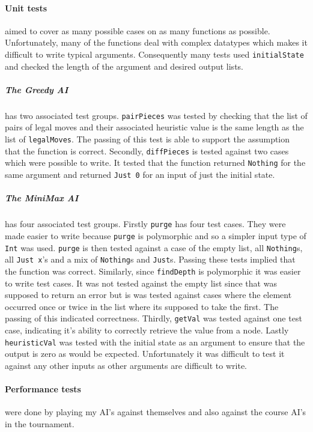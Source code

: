 \documentclass[11pt]{article}
\begin{document}
\paragraph{Unit tests} aimed to cover as many possible cases on as many functions as possible. Unfortunately, many of the functions deal with complex datatypes which makes it difficult to write typical arguments. Consequently many tests used \verb|initialState| and checked the length of the argument and desired output lists.

\subparagraph{The Greedy AI} has two associated test groups. \verb|pairPieces| was tested by checking that the list of pairs of legal moves and their associated heuristic value is the same length as the list of \verb|legalMoves|. The passing of this test is able to support the assumption that the function is correct. Secondly, \verb|diffPieces| is tested against two cases which were possible to write. It tested that the function returned \verb|Nothing| for the same argument and returned \verb|Just 0| for an input of just the initial state.

\subparagraph{The MiniMax AI} has four associated test groups. Firstly \verb|purge| has four test cases. They were made easier to write because \verb|purge| is polymorphic and so a simpler input type of \verb|Int| was used. \verb|purge| is then tested against a case of the empty list, all \verb|Nothing|s, all \verb|Just x|'s and a mix of \verb|Nothing|s and \verb|Just|s. Passing these tests implied that the function was correct. Similarly, since \verb|findDepth| is polymorphic it was easier to write test cases. It was not tested against the empty list since that was supposed to return an error but is was tested against cases where the element occurred once or twice in the list where its supposed to take the first. The passing of this indicated correctness. Thirdly, \verb|getVal| was tested against one test case, indicating it's ability to correctly retrieve the value from a node. Lastly \verb|heuristicVal| was tested with the initial state as an argument to ensure that the output is zero as would be expected. Unfortunately it was difficult to test it against any other inputs as other arguments are difficult to write.

\paragraph{Performance tests} were done by playing my AI's against themselves and also against the course AI's in the tournament.
\end{document}
